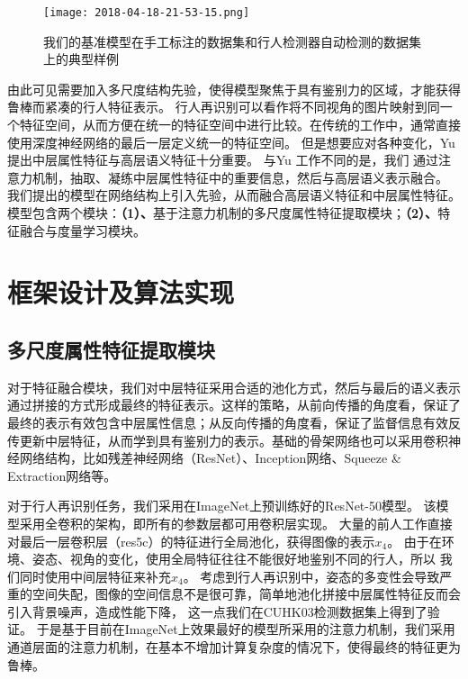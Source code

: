 \begin{figure}
	\centering
	\texttt{[image: 2018-04-18-21-53-15.png]}
	\caption{我们的基准模型在手工标注的数据集和行人检测器自动检测的数据集上的典型样例} \label{fig:label2det}
\end{figure}

由此可见需要加入多尺度结构先验，使得模型聚焦于具有鉴别力的区域，才能获得鲁棒而紧凑的行人特征表示。
行人再识别可以看作将不同视角的图片映射到同一个特征空间，从而方便在统一的特征空间中进行比较。在传统的工作中，通常直接使用深度神经网络的最后一层定义统一的特征空间。
但是想要应对各种变化，Yu \etal \cite{yu2017devil}提出中层属性特征与高层语义特征十分重要。
与Yu \etal 工作不同的是，我们
通过注意力机制，抽取、凝练中层属性特征中的重要信息，然后与高层语义表示融合。
我们提出的模型在网络结构上引入先验，从而融合高层语义特征和中层属性特征。
模型包含两个模块：\textbf{（1）、}基于注意力机制的多尺度属性特征提取模块；\textbf{（2）、}特征融合与度量学习模块。

\section{框架设计及算法实现}

\subsection{多尺度属性特征提取模块}

对于特征融合模块，我们对中层特征采用合适的池化方式，然后与最后的语义表示通过拼接的方式形成最终的特征表示。这样的策略，从前向传播的角度看，保证了最终的表示有效包含中层属性信息；从反向传播的角度看，保证了监督信息有效反传更新中层特征，从而学到具有鉴别力的表示。基础的骨架网络也可以采用卷积神经网络结构，比如残差神经网络（ResNet）\cite{he2016identity}、Inception网络\cite{szegedy2015going}、Squeeze \& Extraction网络\cite{hu2017senet}等。

对于行人再识别任务，我们采用在ImageNet上预训练好的ResNet-50模型。
该模型采用全卷积的架构，即所有的参数层都可用卷积层实现。
大量的前人工作直接对最后一层卷积层（res5c）的特征进行全局池化，获得图像的表示$x_4$。
由于在环境、姿态、视角的变化，使用全局特征往往不能很好地鉴别不同的行人，所以
我们同时使用中间层特征来补充$x_4$。
考虑到行人再识别中，姿态的多变性会导致严重的空间失配，图像的空间信息不是很可靠，简单地池化拼接中层属性特征反而会引入背景噪声，造成性能下降，
这一点我们在CUHK03检测数据集上得到了验证。
于是基于目前在ImageNet上效果最好的模型所采用的注意力机制\cite{hu2017senet}，我们采用通道层面的注意力机制，在基本不增加计算复杂度的情况下，使得最终的特征更为鲁棒。


